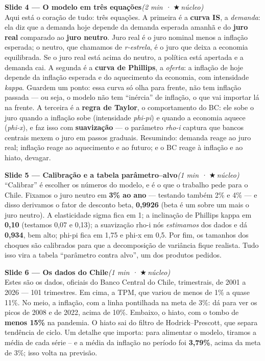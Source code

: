 \documentclass[11pt,a4paper]{article}
\newcommand{\slide}[3]{\medskip\noindent{\color{azul}\rule{3pt}{14pt}}\;
  \textbf{Slide #1 --- #2}\hfill\textit{(#3)}\\[1mm]}
\newcommand{\nucleo}{{\color{verdee}\footnotesize$\bigstar$\,núcleo}}
\begin{document}
\slide{4}{O modelo em três equações}{2 min · \nucleo}
Aqui está o coração de tudo: três equações. A primeira é a \textbf{curva IS}, a \emph{demanda}: ela diz
que a demanda hoje depende da demanda esperada amanhã e do \textbf{juro real} comparado ao \textbf{juro
neutro}. Juro real é o juro nominal menos a inflação esperada; o neutro, que chamamos de
\emph{r-estrela}, é o juro que deixa a economia equilibrada. Se o juro real está acima do neutro, a
política está apertada e a demanda cai. A segunda é a \textbf{curva de Phillips}, a \emph{oferta}: a
inflação de hoje depende da inflação esperada e do aquecimento da economia, com intensidade
\emph{kappa}. Guardem um ponto: essa curva só olha para frente, não tem inflação passada --- ou seja,
o modelo não tem ``inércia'' de inflação, o que vai importar lá na frente. A terceira é a \textbf{regra
de Taylor}, o comportamento do BC: ele sobe o juro quando a inflação sobe (intensidade \emph{phi-pi}) e
quando a economia aquece (\emph{phi-x}), e faz isso com \textbf{suavização} --- o parâmetro
\emph{rho-i} captura que bancos centrais mexem o juro em passos graduais. Resumindo: demanda reage ao
juro real; inflação reage ao aquecimento e ao futuro; e o BC reage à inflação e ao hiato, devagar.

\slide{5}{Calibração e a tabela parâmetro--alvo}{1 min · \nucleo}
``Calibrar'' é escolher os números do modelo, e é o que o trabalho pede para o Chile. Fixamos o juro
neutro em \textbf{3\% ao ano} --- testando também 2\% e 4\% --- e disso derivamos o fator de desconto
beta, \textbf{0,9926} (beta é um sobre um mais o juro neutro). A elasticidade sigma fica em 1; a
inclinação de Phillips kappa em \textbf{0,10} (testamos 0,07 e 0,13); a suavização rho-i nós
\emph{estimamos} dos dados e dá \textbf{0,934}, bem alto; phi-pi fica em 1,75 e phi-x em 0,5. Por fim,
os tamanhos dos choques são calibrados para que a decomposição de variância fique realista. Tudo isso
vira a tabela ``parâmetro contra alvo'', um dos produtos pedidos.

\slide{6}{Os dados do Chile}{1 min · \nucleo}
Estes são os dados, oficiais do Banco Central do Chile, trimestrais, de 2001 a 2026 --- 101
trimestres. Em cima, a TPM, que variou de menos de 1\% a quase 11\%. No meio, a inflação, com a linha
pontilhada na meta de 3\%: dá para ver os picos de 2008 e de 2022, acima de 10\%. Embaixo, o hiato,
com o tombo de \textbf{menos 15\%} na pandemia. O hiato sai do filtro de Hodrick--Prescott, que separa
tendência de ciclo. Um detalhe que importa: para alimentar o modelo, tiramos a média de cada série --
e a média da inflação no período foi \textbf{3,79\%}, acima da meta de 3\%; isso volta na previsão.
\end{document}
